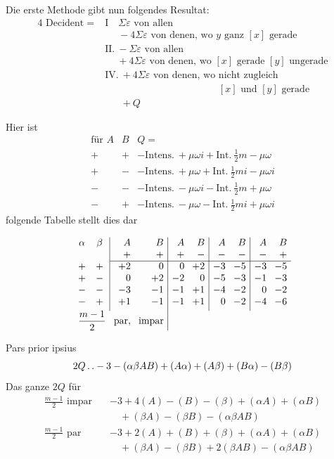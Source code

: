 %
Die erste Methode gibt nun folgendes Resultat:
\[
\begin{aligned}
4\text{ Decident}={}&\mathrm{I}\quad\Sigma\varepsilon\text{ von allen}\\
&\phantom{\mathrm{I}\quad}{-}4\Sigma\varepsilon\text{ von denen, wo }y\text{ ganz }[x]\text{ gerade}\\[3pt]
&\mathrm{II.}\ {-}\Sigma\varepsilon\text{ von allen}\\
&\phantom{\mathrm{II.}\ }{+}4\Sigma\varepsilon\text{ von denen, wo }[x]\text{ gerade }[y]\text{ ungerade}\\[3pt]
&\mathrm{IV.}\ {+}4\Sigma\varepsilon\text{ von denen, wo nicht zugleich}\\
&\phantom{\mathrm{IV.}\ {+}4\Sigma\varepsilon\text{ von denen, wo }}[x]\text{ und }[y]\text{ gerade}\\
&\phantom{\mathrm{IV.}\ }{+}Q
\end{aligned}
\]

Hier ist
\[
\begin{array}{cc|l}
\text{für }A&B&Q=\\
+&+&-\text{Intens.}\ {+}\mu\omega i+\text{Int.}\ \frac12m-\mu\omega\\
+&-&-\text{Intens.}\ {+}\mu\omega+\text{Int.}\ \frac12mi-\mu\omega i\\
-&-&-\text{Intens.}\ {-}\mu\omega i-\text{Int.}\ \frac12m+\mu\omega\\
-&+&-\text{Intens.}\ {-}\mu\omega-\text{Int.}\ \frac12mi+\mu\omega i
\end{array}
\]
folgende Tabelle stellt dies dar

\[
\setlength{\arraycolsep}{4pt}
\begin{array}{cc|rr|rr|rr|rr}
\alpha&\beta& A&B&A&B&A&B&A&B\\
&&+&+&+&-&-&-&-&+\\ \cline{3-10}
+&+&+2&0&0&+2&-3&-5&-3&-5\\
+&-&0&+2&-2&0&-5&-3&-1&-3\\
-&-&-3&-1&-1&+1&-4&-2&0&-2\\
-&+&+1&-1&-1&+1&0&-2&-4&-6\\[3pt]
\multicolumn{2}{r}{\dfrac{m-1}{2}}&\text{par,}&\text{impar}&\multicolumn{6}{c}{}
\end{array}
\]

Pars prior ipsius
\[
2Q\mathinner{.\,.} -3-(\alpha\beta AB)+(A\alpha)+(A\beta)+(B\alpha)-(B\beta)
\]
Das ganze $2Q$ für
\[
\begin{aligned}
\frac{m-1}{2}\text{ impar}\quad&-3+4(A)-(B)-(\beta)+(\alpha A)+(\alpha B)\\
&\quad +(\beta A)-(\beta B)-(\alpha\beta AB)\\[3pt]
\frac{m-1}{2}\text{ par}\quad&-3+2(A)+(B)+(\beta)+(\alpha A)+(\alpha B)\\
&\quad +(\beta A)-(\beta B)+2(\beta AB)-(\alpha\beta AB)
\end{aligned}
\]

